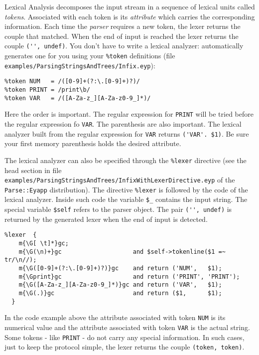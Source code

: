 Lexical Analysis decomposes the input stream in a 
sequence of lexical units called \emph{tokens}.
Associated with each token is its \emph{attribute}
which carries the corresponding information.
Each time the \emph{parser}
requires a new token, the lexer returns
the couple  that matched.
When the end of input is reached the lexer
returns the couple \verb|('', undef)|.
You don't have to write a lexical analyzer:
 automatically generates one
for you using your \verb|%token| definitions
(file \verb|examples/ParsingStringsAndTrees/Infix.eyp|):


\begin{verbatim}
%token NUM   = /([0-9]+(?:\.[0-9]+)?)/
%token PRINT = /print\b/
%token VAR   = /([A-Za-z_][A-Za-z0-9_]*)/
\end{verbatim}

Here the order is important. The regular expression
for \verb|PRINT| will be tried before the regular expression
fo \verb|VAR|. The parenthesis are also important. The 
lexical analyzer built from the regular expression 
for \verb|VAR| returns \verb|('VAR'. $1)|. Be sure your first memory
parenthesis holds the desired attribute.

The lexical analyzer can also be specified
through the \verb|%lexer| directive (see
the head section in file \verb|examples/ParsingStringsAndTrees/InfixWithLexerDirective.eyp| of the 
\verb|Parse::Eyapp| distribution).
The directive \verb|%lexer| is followed by the code of the lexical analyzer.
Inside such code the variable \verb|$_| contains the input string. The special
variable \verb|$self| refers to the parser object. The pair \verb|('', undef)|
is returned by the generated lexer when the end of input is detected.

\begin{verbatim}
%lexer  {
    m{\G[ \t]*}gc;
    m{\G(\n)+}gc                    and $self->tokenline($1 =~ tr/\n//);
    m{\G([0-9]+(?:\.[0-9]+)?)}gc    and return ('NUM',   $1);
    m{\Gprint}gc                    and return ('PRINT', 'PRINT');
    m{\G([A-Za-z_][A-Za-z0-9_]*)}gc and return ('VAR',   $1);
    m{\G(.)}gc                      and return ($1,      $1);
  }
\end{verbatim}
In the code example above
the attribute associated with token \verb|NUM|
is its numerical value and the attribute associated with 
token \verb|VAR| is the actual string.
Some tokens - like \verb|PRINT| -  do not carry any special
information. In such cases, just to keep the protocol
simple, the lexer returns the couple \verb|(token, token)|.

